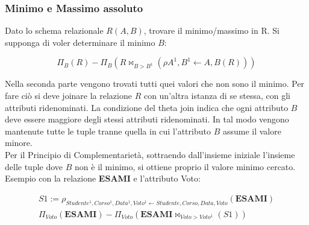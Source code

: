 \subsubsection{Minimo e Massimo assoluto}

Dato lo schema relazionale $R(A,B)$, trovare il minimo/massimo in R.
Si supponga di voler determinare il minimo $B$:

\begin{displaymath}
  \Pi_{B}(R) - \Pi_{B}(R \bowtie_{B>B^1}(\rho{A^1,B^1 \leftarrow A,B}(R)))
\end{displaymath}

Nella seconda parte vengono trovati tutti quei valori che non sono il minimo.
Per fare ciò si deve joinare la relazione $R$ con un'altra istanza di se stessa,
con gli attributi ridenominati. La condizione del theta join indica che ogni attributo
$B$ deve essere maggiore degli stessi attributi ridenominati. In tal modo vengono
mantenute tutte le tuple tranne quella in cui l'attributo $B$ assume il valore minore. \\

\noindent
Per il Principio di Complementarietà, sottraendo dall'insieme iniziale l'insieme delle
tuple dove $B$ non è il minimo, si ottiene proprio il valore minimo cercato. \\

\noindent
Esempio con la relazione \textbf{ESAMI} e l'attributo Voto:

\begin{gather*}
  S1 := \rho_{Studente^1,Corso^1,Data^1,Voto^1 \leftarrow Studente,Corso,Data,Voto}(\textbf{ESAMI}) \\
  \Pi_{Voto}(\textbf{ESAMI}) - \Pi_{Voto}(\textbf{ESAMI} \bowtie_{Voto>Voto^1}(S1))
\end{gather*}